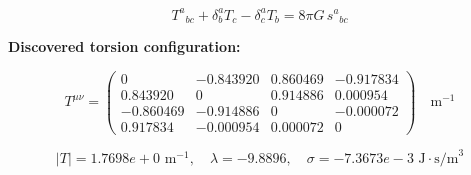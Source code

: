 
\begin{equation}
  T^a{}_{bc} + \delta^a_b T_c - \delta^a_c T_b = 8\pi G \, s^a{}_{bc}
\end{equation}

\textbf{Discovered torsion configuration:}

\begin{equation}
  T^{\mu\nu} = \begin{pmatrix}
    0 & -0.843920 & 0.860469 & -0.917834 \\
    0.843920 & 0 & 0.914886 & 0.000954 \\
    -0.860469 & -0.914886 & 0 & -0.000072 \\
    0.917834 & -0.000954 & 0.000072 & 0
  \end{pmatrix} \quad \text{m}^{-1}
\end{equation}

\begin{equation}
  |T| = 1.7698e+0 \text{ m}^{-1}, \quad
  \lambda = -9.8896, \quad
  \sigma = -7.3673e-3 \text{ J}\cdot\text{s/m}^3
\end{equation}